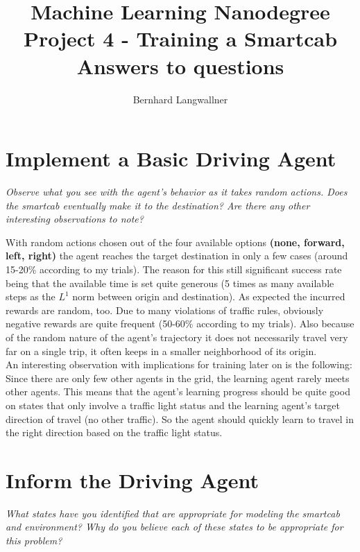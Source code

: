\documentclass[a4paper,11pt]{article}
\title{Machine Learning Nanodegree Project 4 - Training a Smartcab \\ Answers to questions}
\author{Bernhard Langwallner}
\numberwithin{equation}{section}
\numberwithin{figure}{section}
\begin{document}
\sffamily
\maketitle


\section*{\sffamily Implement a Basic Driving Agent}
\textit{Observe what you see with the agent's behavior as it takes random actions. Does the smartcab eventually make it to the destination? Are there any other interesting observations to note?}

With random actions chosen out of the four available options \textbf{(none, forward, left, right)} the agent reaches the target destination in only a few cases (around 15-20\% according to my trials). The reason for this still significant success rate being that the available time is set quite generous (5 times as many available steps as the $L^1$ norm between origin and destination). As expected the incurred rewards are random, too. Due to many violations of traffic rules, obviously negative rewards are quite frequent (50-60\% according to my trials). Also because of the random nature of the agent's trajectory it does not necessarily travel very far on a single trip, it often keeps in a smaller neighborhood of its origin.\\
An interesting observation with implications for training later on is the following: Since there are only few other agents in the grid, the learning agent rarely meets other agents. This means that the agent's learning progress should be quite good on states that only involve a traffic light status and the learning agent's target direction of travel (no other traffic). So the agent should quickly learn to travel in the right direction based on the traffic light status.


\section*{\sffamily Inform the Driving Agent}
\textit{What states have you identified that are appropriate for modeling the smartcab and environment? Why do you believe each of these states to be appropriate for this problem?}
\end{document}
